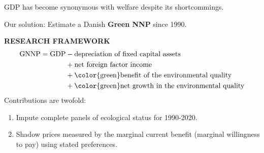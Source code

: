 \begin{frame}
  GDP has become synonymous with welfare despite its shortcommings.\par
  Our solution: Estimate a Danish \textbf{Green NNP} since 1990.
  \begin{tcolorbox}
    \textbf{RESEARCH FRAMEWORK}
    \begin{align*}
        \text{GNNP} = \text{GDP} &- \text{depreciation of fixed capital assets} \\
        &+ \text{net foreign factor income} \\
        &+ \text{\color{green}benefit of the environmental quality} \\
        &+ \text{\color{green}net growth in the environmental quality}
    \end{align*}
    Contributions are twofold:
    \begin{enumerate}
      \item Impute complete panels of ecological status for 1990-2020.
      \item Shadow prices measured by the marginal current benefit (marginal willingness to pay) using stated preferences.
    \end{enumerate}
  \end{tcolorbox}
  \vfill
\end{frame}
